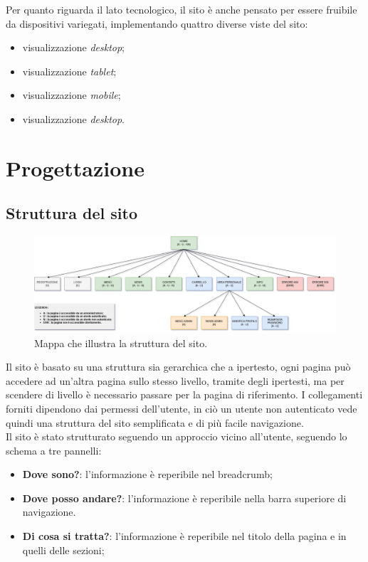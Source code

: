 \documentclass{template}
\begin{document}
	Per quanto riguarda il lato tecnologico, il sito è anche pensato per essere fruibile da dispositivi variegati, implementando quattro diverse viste del sito:
	\begin{itemize}
		\item visualizzazione \textit{desktop};
		\item visualizzazione \textit{tablet};
		\item visualizzazione \textit{mobile};
		\item visualizzazione \textit{desktop}.
	\end{itemize}

	\section{Progettazione}
	\subsection{Struttura del sito}
	\begin{figure}[H]
		\centering
		\includegraphics[scale=0.3]{src/mappa_sito.png}
		\caption{Mappa che illustra la struttura del sito.}
	\end{figure}
	
	Il sito è basato su una struttura sia gerarchica che a ipertesto, ogni pagina può accedere ad un'altra pagina sullo stesso livello, tramite degli ipertesti, ma per scendere di livello è necessario passare per la pagina di riferimento. I collegamenti forniti dipendono dai permessi dell'utente, in ciò un utente non autenticato vede quindi una struttura del sito semplificata e di più facile navigazione. \\
	Il sito è stato strutturato seguendo un approccio vicino all'utente, seguendo lo schema a tre pannelli:
	\begin{itemize}
		\item \textbf{Dove sono?}: l'informazione è reperibile nel breadcrumb;
		\item \textbf{Dove posso andare?}: l'informazione è reperibile nella barra superiore di navigazione.
		\item \textbf{Di cosa si tratta?}: l'informazione è reperibile nel titolo della pagina e in quelli delle sezioni;
	\end{itemize} 
\end{document}
